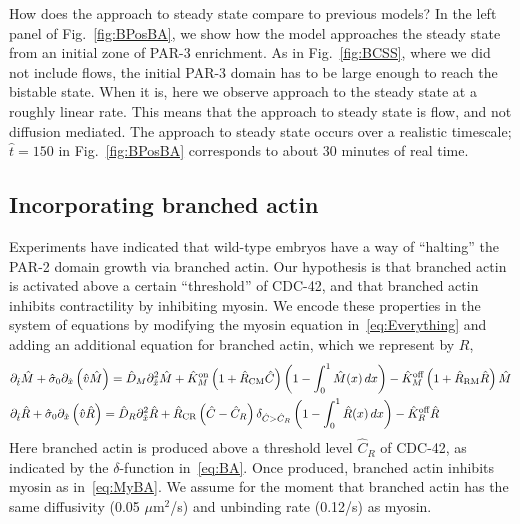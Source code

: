 \documentclass[11pt]{article}
\newcommand{\red}[1]{\color{red}#1\normalcolor}
\newcommand{\6}[1]{#1_{\text{6}}}
\newcommand{\3}[1]{#1_{\text{3}}}
\begin{document}
How does the approach to steady state compare to previous models? In the left panel of Fig.\ \ref{fig:BPosBA}, we show how the model approaches the steady state from an initial zone of PAR-3 enrichment. As in Fig.\ \ref{fig:BCSS}, where we did not include flows, the initial PAR-3 domain has to be large enough to reach the bistable state. When it is, here we observe approach to the steady state at a roughly linear rate. This means that the approach to steady state is flow, and not diffusion mediated. \red{The approach to steady state occurs over a realistic timescale; $\hat t=150$ in Fig.\ \ref{fig:BPosBA} corresponds to about 30 minutes of real time.}



\subsection{Incorporating branched actin}
Experiments have indicated that wild-type embryos have a way of ``halting'' the PAR-2 domain growth via branched actin. Our hypothesis is that branched actin is activated above a certain ``threshold'' of CDC-42, and that branched actin inhibits contractility by inhibiting myosin. We encode these properties in the system of equations by modifying the myosin equation in\ \eqref{eq:Everything} and adding an additional equation for branched actin, which we represent by $R$,  
\begin{subequations} 
\label{eq:BAll}
\begin{align}
\label{eq:MyBA}
&\partial_{\hat{t}} \hat{M} +\hat{\sigma}_0  \partial_{\hat{x}} \left(\hat{v} \hat{M} \right) =\hat{D}_M \partial_{\hat{x}}^2 \hat{M} +\hat{K}^\text{on}_M \left(1+\hat{R}_\text{CM} \hat C\right) \left(1-\int_0^1  \hat{M}(x) \, dx\right)- \hat{K}^\text{off}_M \left(1+\hat R_\text{RM} \hat R\right) \hat{M}\\
\label{eq:BA}
&\partial_{\hat{t}} \hat{R} +\hat{\sigma}_0  \partial_{\hat{x}} \left(\hat{v} \hat{R} \right) =\hat{D}_R \partial_{\hat{x}}^2 \hat{R} +\hat R_\text{CR} \left(\hat C-\hat C_R\right) {\delta}_{\hat C > \hat C_R} \left(1-\int_0^1  \hat{R}(x) \, dx\right)- \hat{K}^\text{off}_R \hat{R}
\end{align}
\end{subequations}
Here branched actin is produced above a threshold level $\hat C_R$ of CDC-42, as indicated by the $\delta$-function in\ \eqref{eq:BA}. Once produced, branched actin inhibits myosin as in\ \eqref{eq:MyBA}. \red{We assume for the moment that branched actin has the same diffusivity (0.05 $\mu$m$^2$/s) and unbinding rate (0.12/s) as myosin.}
\end{document}
